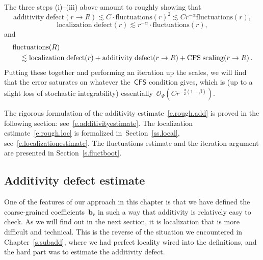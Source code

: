 \documentclass[11pt,twoside]{article} %
\numberwithin{equation}{section}
\theoremstyle{definition}
\renewcommand{\b}{\ensuremath{\mathbf{b}}}
\renewcommand{\O}{\mathcal{O}}
\newcommand{\CFS}{\mathsf{CFS}}
\begin{document}
The three steps (i)--(iii) above amount to roughly showing that 
\begin{equation}
\label{e.rough.add}
\mathrm{additivity \; defect}(r\to R)
\lesssim
C\cdot \mathrm{fluctuations}(r)^2
\lesssim C r^{-\alpha} \mathrm{fluctuations}(r),
\end{equation}
\begin{equation}
\label{e.rough.loc}
\mathrm{localization \; defect} (r)
\lesssim
r^{-\alpha} \cdot \mathrm{fluctuations}(r),
\end{equation}
and
\begin{align}
\lefteqn{ \mathrm{fluctuations}(R) } \quad & 
\notag \\ & 
\lesssim
\mathrm{localization \; defect} (r)
+
\mathrm{additivity \; defect}(r\to R)
+ 
\mathrm{CFS \; scaling}(r\to R)\,.
\end{align}
Putting these together and performing an iteration up the scales, we will find that the error saturates on whatever the~$\CFS$ condition gives, which is (up to a slight loss of stochastic integrability) essentially~$\O_\Psi(Cr^{-\frac d2(1-\beta)})$.

\smallskip

The rigorous formulation of the additivity estimate~\eqref{e.rough.add}
is proved in the following section: see~\eqref{e.additivityestimate}. 
The localization estimate~\eqref{e.rough.loc} is formalized in~Section~\ref{ss.local}, see~\eqref{e.localizationestimate}. 
The fluctuations estimate and the iteration argument are presented in Section~\ref{s.fluctboot}.

\subsection{Additivity defect estimate}

One of the features of our approach in this chapter is that we have defined the coarse-grained coefficients~$\b_r$ in such a way that additivity is relatively easy to check. As we will find out in the next section, it is localization that is more difficult and technical. This is the reverse of the situation we encountered in Chapter~\ref{s.subadd}, where we had perfect locality wired into the definitions, and the hard part was to estimate the additivity defect. 

\smallskip
\end{document}
